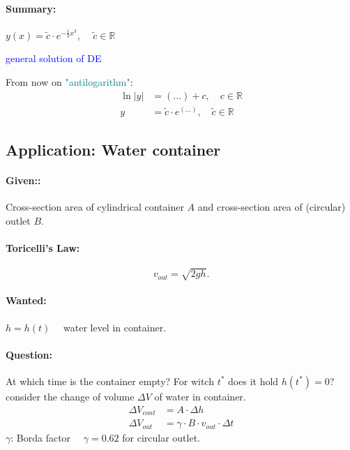 \documentclass[]{article}
\begin{document}
	\paragraph{Summary:}  $y(x)=\tilde c \cdot e ^{- \frac{1}{3}x ^{3}}$, $\quad\tilde c\in \mathbb R$ \begin{center}
	 \textcolor{blue}{general solution of DE}\\
	\end{center}
	From now on \textcolor{teal}{"antilogarithm"}: \[
	\begin{split}
		\ln|y| & = (...)+c,\quad c\in \mathbb R \\
		y & =\tilde c \cdot e ^{(...)},\quad \tilde c\in \mathbb R
	\end{split}
	\]
	\subsection{Application: Water container}
	\paragraph{Given::} Cross-section area of cylindrical container $A$ and cross-section area of (circular) outlet $B$.
	\paragraph{Toricelli's Law:} 
	\[
		v_{out}=\sqrt {2gh}
	.\]
	\paragraph{Wanted:} $h=h(t)\quad$ water level in container.
	\paragraph{Question:} At which time is the container empty? For witch $t ^{*}$ does it hold $h(t ^{*})=0$?\\
	consider the change of volume $\Delta V$ of water in container.
	\[
	\begin{split}
		 \Delta V_{cont} &= A \cdot \Delta h \\
		 \Delta V_{out}& = \gamma \cdot B \cdot v_{out} \cdot \Delta t 
	\end{split}
	\]
	$\gamma$: Borda factor $\quad \gamma=0.62$ for circular outlet.
\end{document}
